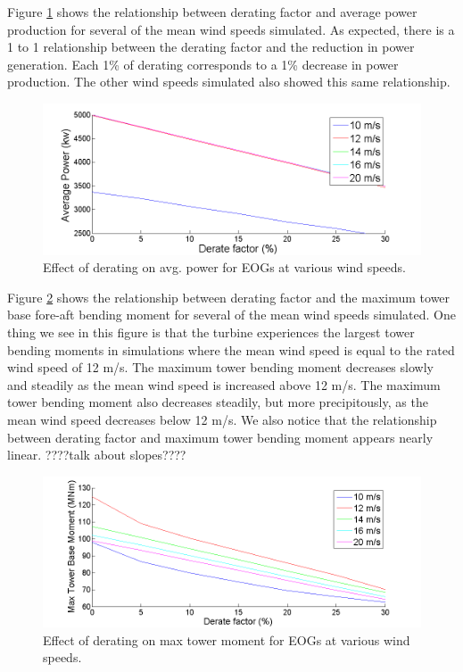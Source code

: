 Figure \ref{fig4-5} shows the relationship between derating factor and average power production for several of the mean wind speeds simulated. As expected, there is a 1 to 1 relationship between the derating factor and the reduction in power generation. Each 1\% of derating corresponds to a 1\% decrease in power production. The other wind speeds simulated also showed this same relationship.

\begin{figure}[htbp]
	\centering
		\includegraphics[trim = {1cm 0 2cm 0}, clip, width = \linewidth]{Figures/ch4Figures/fig4-5.png}
		
	\caption{Effect of derating on avg. power for EOGs at various wind speeds.}
	\label{fig4-5}
\end{figure}

Figure \ref{fig4-6} shows the relationship between derating factor and the maximum tower base fore-aft bending moment for several of the mean wind speeds simulated. One thing we see in this figure is that the turbine experiences the largest tower bending moments in simulations where the mean wind speed is equal to the rated wind speed of 12 m/s. The maximum tower bending moment decreases slowly and steadily as the mean wind speed is increased above 12 m/s. The maximum tower bending moment also decreases steadily, but more precipitously, as the mean wind speed decreases below 12 m/s. We also notice that the relationship between derating factor and maximum tower bending moment appears nearly linear. ????talk about slopes????

\begin{figure}[htbp]
	\centering
		\includegraphics[trim = {1cm 0 2cm 0}, clip, width = \linewidth]{Figures/ch4Figures/fig4-6.png}
		
	\caption{Effect of derating on max tower moment for EOGs at various wind speeds.}
	\label{fig4-6}
\end{figure}

